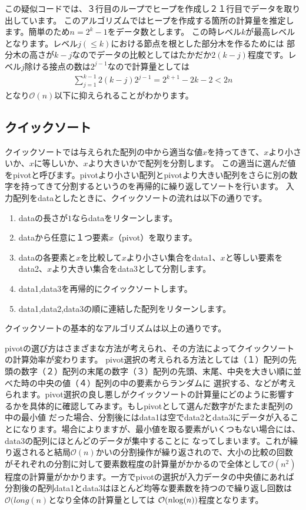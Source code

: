 \documentclass[dvipdfmx,pic,eepic,ecltree]{jarticle}
\begin{document}
この疑似コードでは、３行目のループでヒープを作成し２１行目でデータを取り出しています。
このアルゴリズムではヒープを作成する箇所の計算量を推定します。簡単のため$n=2^{k}-1$をデータ数とします。
この時レベル$k$が最高レベルとなります。レベル$j(\leq k)$における節点を根とした部分木を作るためには
部分木の高さが$k-j$なのでデータの比較としてはたかだか$2(k-j)$程度です。レベル$j$除ける接点の数は$2^{j-1}$なので計算量としては
\begin{eqnarray}
\sum_{j=1}^{k-1}2(k-j)2^{j-1}=2^{k+1}-2k-2<2n
\end{eqnarray}
となり$\mathcal{O}(n)$以下に抑えられることがわかります。
\subsection{クイックソート}
クイックソートでは与えられた配列の中から適当な値$x$を持ってきて、$x$より小さいか、$x$に等しいか、$x$より大きいかで配列を分割します。
この適当に選んだ値をpivotと呼びます。pivotより小さい配列とpivotより大きい配列をさらに別の数字を持ってきて分割するというのを再帰的に繰り返してソートを行います。
入力配列をdataとしたときに、クイックソートの流れは以下の通りです。
\begin{enumerate}
\item dataの長さが$1$ならdataをリターンします。
\item dataから任意に１つ要素$x$（pivot）を取ります。
\item dataの各要素と$x$を比較して$x$より小さい集合をdata1、$x$と等しい要素をdata2、$x$より大きい集合をdata3として分割します。
\item data1,data3を再帰的にクイックソートします。
\item data1,data2,data3の順に連結した配列をリターンします。
\end{enumerate}
クイックソートの基本的なアルゴリズムは以上の通りです。

pivotの選び方はさまざまな方法が考えられ、その方法によってクイックソートの計算効率が変わります。
pivot選択の考えられる方法としては（１）配列の先頭の数字（２）配列の末尾の数字（３）配列の先頭、末尾、中央を大きい順に並べた時の中央の値（４）配列の中の要素からランダムに
選択する、などが考えられます。pivot選択の良し悪しがクイックソートの計算量にどのように影響するかを具体的に確認してみます。もしpivotとして選んだ数字がたまたま配列の中の最小値
だった場合、分割後にはdata1は空でdata2とdata3にデータが入ることになります。場合によりますが、最小値を取る要素がいくつもない場合には、data3の配列にほとんどのデータが集中することに
なってしまいます。これが繰り返されると結局$\mathcal{O}(n)$かいの分割操作が繰り返されので、大小の比較の回数がそれぞれの分割に対して要素数程度の計算量がかかるので全体として$\mathcal{O}(n^2)$
程度の計算量がかかります。一方でpivotの選択が入力データの中央値にあれば分割後の配列data1とdata3はほとんど均等な要素数を持つので繰り返し回数は$\mathcal{O}(long(n)$となり全体の計算量としては
$\mathcal{O}(n{\rm log}(n))$程度となります。
\end{document}
